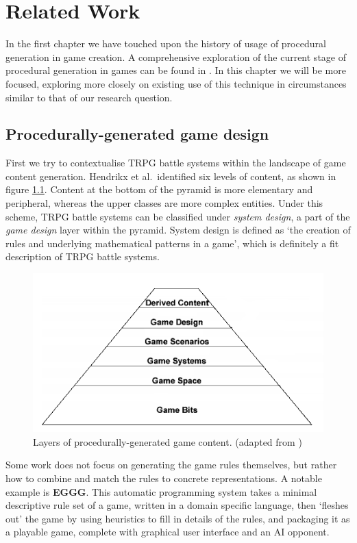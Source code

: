 \chapter{Related Work}

In the first chapter we have touched upon the history of usage of procedural generation in game creation. A comprehensive exploration of the current stage of procedural generation in games can be found in \cite{pcgbook}. In this chapter we will be more focused, exploring more closely on existing use of this technique in circumstances similar to that of our research question.

\section{Procedurally-generated game design}

First we try to contextualise TRPG battle systems within the landscape of game content generation. Hendrikx et al.\cite{hendrikx2013procedural}\ identified six levels of content, as shown in figure \ref{fig:pyramid}. Content at the bottom of the pyramid is more elementary and peripheral, whereas the upper classes are more complex entities. Under this scheme, TRPG battle systems can be classified under \textit{system design}, a part of the \textit{game design} layer within the pyramid. System design is defined as `the creation of rules and underlying mathematical patterns in a game'\cite[5]{brathwaite2009challenges}, which is definitely a fit description of TRPG battle systems.

\begin{figure}
	\centering
	\includegraphics[width=.6\linewidth]{figures/PCG_pyramid}
	\caption{Layers of procedurally-generated game content. (adapted from \cite{hendrikx2013procedural})}
	\label{fig:pyramid}
\end{figure}

Some work does not focus on generating the game rules themselves, but rather how to combine and match the rules to concrete representations. A notable example is  \textbf{EGGG}\cite{orwant2000eggg}. This automatic programming system takes a minimal descriptive rule set of a game, written in a domain specific language, then `fleshes out' the game by using heuristics to fill in details of the rules, and packaging it as a playable game, complete with graphical user interface and an AI opponent.

